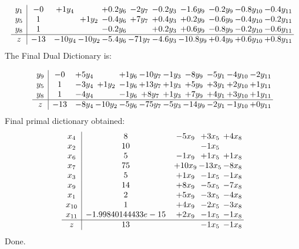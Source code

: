 \documentclass[11pt]{article}
\begin{document}
\[\begin{array}{c| c c@{\hskip 2pt} c@{\hskip 2pt} c@{\hskip 2pt} c@{\hskip 2pt} c@{\hskip 2pt} c@{\hskip 2pt} c@{\hskip 2pt} c@{\hskip 2pt} c@{\hskip 2pt} }
 y_{1}   &  -0 & + 1 y_{4} &   & + 0.2 y_{6} & -2 y_{7} & -0.2 y_{3} & -1.6 y_{9} & -0.2 y_{9} & -0.8 y_{10} & -0.4 y_{11}\\
 y_{5}   &  1  &   & + 1 y_{2} & -0.4 y_{6} & + 7 y_{7} & + 0.4 y_{3} & + 0.2 y_{9} & -0.6 y_{9} & -0.4 y_{10} & -0.2 y_{11}\\
 y_{8}   &  1  &    &   & -0.2 y_{6} &   & + 0.2 y_{3} & + 0.6 y_{9} & -0.8 y_{9} & -0.2 y_{10} & -0.6 y_{11}\\
\hline
z    &  -13 & -10 y_{4} & -10 y_{2} & -5.4 y_{6} & -71 y_{7} & -4.6 y_{3} & -10.8 y_{9} & + 0.4 y_{9} & + 0.6 y_{10} & + 0.8 y_{11}\\
\end{array}\]
The Final Dual Dictionary is: 

\[\begin{array}{c| c c@{\hskip 2pt} c@{\hskip 2pt} c@{\hskip 2pt} c@{\hskip 2pt} c@{\hskip 2pt} c@{\hskip 2pt} c@{\hskip 2pt} c@{\hskip 2pt} c@{\hskip 2pt} }
 y_{9}   &  -0 & + 5 y_{4} &   & + 1 y_{6} & -10 y_{7} & -1 y_{3} & -8 y_{9} & -5 y_{1} & -4 y_{10} & -2 y_{11}\\
 y_{5}   &  1 & -3 y_{4} & + 1 y_{2} & -1 y_{6} & + 13 y_{7} & + 1 y_{3} & + 5 y_{9} & + 3 y_{1} & + 2 y_{10} & + 1 y_{11}\\
 y_{8}   &  1 & -4 y_{4} &   & -1 y_{6} & + 8 y_{7} & + 1 y_{3} & + 7 y_{9} & + 4 y_{1} & + 3 y_{10} & + 1 y_{11}\\
\hline
z    &  -13 & -8 y_{4} & -10 y_{2} & -5 y_{6} & -75 y_{7} & -5 y_{3} & -14 y_{9} & -2 y_{1} & -1 y_{10} & + 0 y_{11}\\
\end{array}\]
 Final primal dictionary obtained: 
\[\begin{array}{c| c c@{\hskip 2pt} c@{\hskip 2pt} c@{\hskip 2pt} }
 x_{4}   &  8 & -5 x_{9} & + 3 x_{5} & + 4 x_{8}\\
 x_{2}   &  10  &   & -1 x_{5} &   \\
 x_{6}   &  5 & -1 x_{9} & + 1 x_{5} & + 1 x_{8}\\
 x_{7}   &  75 & + 10 x_{9} & -13 x_{5} & -8 x_{8}\\
 x_{3}   &  5 & + 1 x_{9} & -1 x_{5} & -1 x_{8}\\
 x_{9}   &  14 & + 8 x_{9} & -5 x_{5} & -7 x_{8}\\
 x_{1}   &  2 & + 5 x_{9} & -3 x_{5} & -4 x_{8}\\
 x_{10}   &  1 & + 4 x_{9} & -2 x_{5} & -3 x_{8}\\
 x_{11}   &  -1.99840144433e-15 & + 2 x_{9} & -1 x_{5} & -1 x_{8}\\
\hline
z    &  13  &   & -1 x_{5} & -1 x_{8}\\
\end{array}\]
Done.
\end{document}
